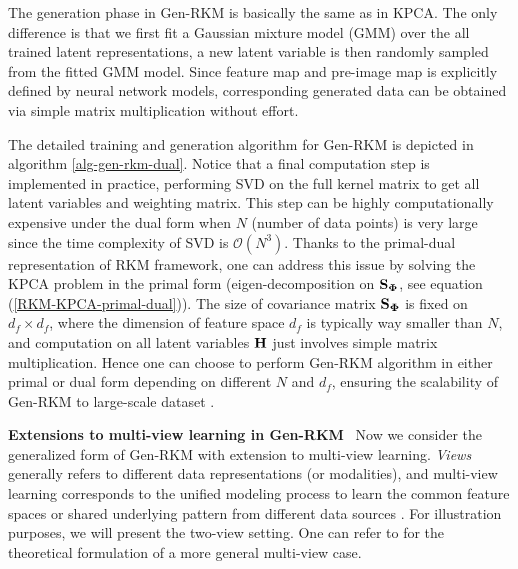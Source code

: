 The generation phase in Gen-RKM is basically the same as in KPCA. The only difference is that we first fit a Gaussian mixture model (GMM) over the all trained latent representations, a new latent variable is then randomly sampled from the fitted GMM model. Since feature map and pre-image map is explicitly defined by neural network models, corresponding generated data can be obtained via simple matrix multiplication without effort. 

The detailed training and generation algorithm for Gen-RKM is depicted in algorithm \ref{alg-gen-rkm-dual}. Notice that a final computation step is implemented in practice, performing SVD on the full kernel matrix to get all latent variables and weighting matrix. This step can be highly computationally expensive under the dual form when $N$ (number of data points) is very large since the time complexity of SVD is $\mathcal{O}(N^3)$. Thanks to the primal-dual representation of RKM framework, one can address this issue by solving the KPCA problem in the primal form (eigen-decomposition on $\mathbf{S}_{\boldsymbol{\Phi}}$, see equation (\ref{RKM-KPCA-primal-dual})). The size of covariance matrix $\mathbf{S}_{\boldsymbol{\Phi}}$ is fixed on $d_f\times d_f$, where the dimension of feature space $d_f$ is typically way smaller than $N$, and computation on all latent variables $\mathbf{H}$ just involves simple matrix multiplication. Hence one can choose to perform Gen-RKM algorithm in either primal or dual form depending on different $N$ and $d_f$, ensuring the scalability of Gen-RKM to large-scale dataset \cite{pandeyGenerativeRestrictedKernel2021, achtenDualityMultiViewRestricted2023}.


\noindent\textbf{Extensions to multi-view learning in Gen-RKM} \ Now we consider the generalized form of Gen-RKM with extension to multi-view learning. \emph{Views} generally refers to different data representations (or modalities), and multi-view learning corresponds to the unified modeling process to learn the common feature spaces or shared underlying pattern from different data sources \cite{yanDeepMultiviewLearning2021}.  For illustration purposes, we will present the two-view setting. One can refer to \cite{achtenDualityMultiViewRestricted2023} for the theoretical formulation of a more general multi-view case.

